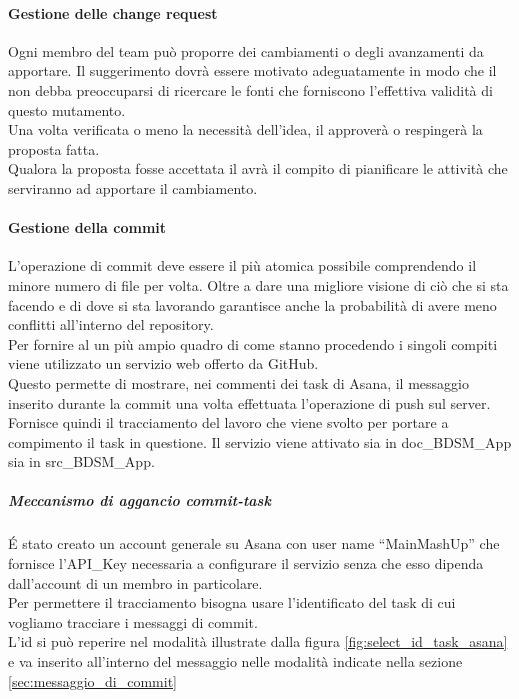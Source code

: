 			\paragraph{Gestione delle change request}
			Ogni membro del team può proporre dei cambiamenti o degli avanzamenti da apportare. Il suggerimento dovrà essere motivato adeguatamente in modo che il \roleProjectManager{} non debba preoccuparsi di ricercare le fonti che forniscono l'effettiva validità di questo mutamento. \\
			Una volta verificata o meno la necessità dell'idea, il \roleProjectManager{} approverà o respingerà la proposta fatta. \\
			Qualora la proposta fosse accettata il \roleProjectManager{} avrà il compito di pianificare le attività che serviranno ad apportare il cambiamento.
			
			\paragraph{Gestione della commit}
			L'operazione di commit\gloss{} deve essere il più atomica possibile comprendendo il minore numero di file per volta. Oltre a dare una migliore visione di ciò che si sta facendo e di dove si sta lavorando garantisce anche la probabilità di avere meno conflitti all'interno del repository\gloss{}. \\
			Per fornire al \roleProjectManager{} un più ampio quadro di come stanno procedendo i singoli compiti viene utilizzato un servizio web offerto da GitHub\gloss{}. \\
			Questo permette di mostrare, nei commenti dei task\gloss{} di Asana\gloss{}, il messaggio inserito durante la commit\gloss{} una volta effettuata l'operazione di push sul server. \\
			Fornisce quindi il tracciamento del lavoro che viene svolto per portare a compimento il task\gloss{} in questione.
			Il servizio viene attivato sia in doc\_BDSM\_App sia in src\_BDSM\_App.
				\subparagraph{Meccanismo di aggancio commit-task} %
				\label{subp:meccanismo_di_aggancio_commit_task}
				\'E stato creato un account generale su Asana\gloss{} con user name ``MainMashUp'' che fornisce l'API\gloss{}\_Key necessaria a configurare il servizio senza che esso dipenda dall'account di un membro in particolare. \\
				Per permettere il tracciamento bisogna usare l'identificato del task\gloss{} di cui vogliamo tracciare i messaggi di commit\gloss{}.\\
				L'id si può reperire nel modalità illustrate dalla figura \ref{fig:select_id_task_asana} e va inserito all'interno del messaggio nelle modalità indicate nella sezione \ref{sec:messaggio_di_commit}
					
